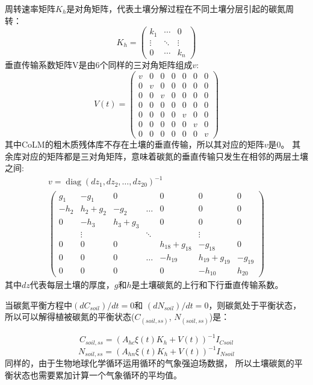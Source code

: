 周转速率矩阵$K_h$是对角矩阵，代表土壤分解过程在不同土壤分层引起的碳氮周转：
\begin{equation}
K_{h}=\left(\begin{array}{ccc}k_{1} & \cdots & 0 \\ \vdots & \ddots & \vdots \\ 0 & \cdots & k_{n}\end{array}\right)
\end{equation}
垂直传输系数矩阵V是由6个同样的三对角矩阵组成$v$:
\begin{equation}
V(t)=\left(\begin{array}{ccccccc}v & 0 & 0 & 0 & 0 & 0 & 0 \\ 0 & v & 0 & 0 & 0 & 0 & 0 \\ 0 & 0 & v & 0 & 0 & 0 & 0 \\ 0 & 0 & 0 & 0 & 0 & 0 & 0 \\ 0 & 0 & 0 & 0 & v & 0 & 0 \\ 0 & 0 & 0 & 0 & 0 & v & 0 \\ 0 & 0 & 0 & 0 & 0 & 0 & v\end{array}\right)
\end{equation}
其中CoLM的粗木质残体库不存在土壤的垂直传输，所以其对应的矩阵$v$是0。
其余库对应的矩阵都是三对角矩阵，意味着碳氮的垂直传输只发生在相邻的两层土壤之间:
\begin{equation}
\begin{array}{c}v=\operatorname{diag}\left(d z_{1}, d z_{2}, \ldots,  d z_{20}\right)^{-1} \\ 
  \left(\begin{array}{ccccccc}g_{1} & -g_{1} & 0 & & 0 & 0 & 0 \\
     -h_{2} & h_{2}+g_{2} & -g_{2} & \ldots & 0 & 0 & 0 \\ 0 & -h_{3} & h_{3}+g_{3} & & 0 & 0 & 0 \\
      & \vdots & & \ddots & & \vdots & \\ 0 & 0 & 0 & & h_{18}+g_{18} & -g_{18} & 0 \\
     0 & 0 & 0 & \ldots & -h_{19} & h_{19}+g_{19} & -g_{19} \\ 0 & 0 & 0 & & 0 & -h_{10} & h_{20}\end{array}\right)\end{array}
\end{equation}
其中$dz$代表每层土壤的厚度，$g$和$h$是土壤碳氮的上行和下行垂直传输系数。

当碳氮平衡方程中$(dC_{soil})/dt=0$和 $(dN_{soil})/dt=0$，则碳氮处于平衡状态，
所以可以解得植被碳氮的平衡状态($C_{(soil,ss)}$, $N_{(soil,ss)}$)是：

\begin{equation}
C_{soil, s s}=\left(A_{h c} \xi(t) K_{h}+V(t)\right)^{-1} I_{C s o i l}
\end{equation}
\begin{equation}
N_{soil, s s}=\left(A_{h n} \xi(t) K_{h}+V(t)\right)^{-1} I_{N s o i l}
\end{equation}
同样的，由于生物地球化学循环运用循环的气象强迫场数据，
所以土壤碳氮的平衡状态也需要累加计算一个气象循环的平均值。 









